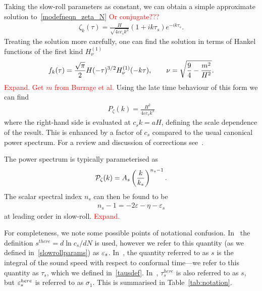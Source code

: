     Taking the slow-roll parameters as constant, we can obtain a simple approximate solution
    to~\eqref{modefneqn_zeta_N}
    \textcolor{red}{Or conjugate???}
    \begin{align}\label{uk_solution}
        \zeta_k(\tau) = \frac{H}{\sqrt{4\varepsilon c_s k^3}}\left(1+ik\tau_s\right)e^{-i k\tau_s}.
    \end{align}
    Treating the solution more carefully, one can find
    the solution in terms of Hankel functions of the first kind $H_{\nu}^{(1)}$
    \begin{align}
        f_k(\tau) = \frac{\sqrt{\pi}}{2}H(-\tau)^{3/2}H^{(1)}_{\nu}(-k\tau),\qquad
        \nu = \sqrt{\frac{9}{4} - \frac{m^2}{H^2}}.
    \end{align}
    \textcolor{red}{Expand. Get $m$ from Burrage et al.}
    Using the late time behaviour of this form we can find
    \begin{align}
        P_\zeta(k) = \frac{H^2}{4\varepsilon c_s k^3}
    \end{align}
    where the right-hand side is evaluated at $c_sk=aH$,
    defining the scale dependence of the result.
    This is enhanced by a factor of $c_s$ compared to the
    usual canonical power spectrum.
    For a review and discussion of corrections see~\cite{px_burrage}.


The power spectrum is typically parameterised as
\begin{align}
    \mathcal{P}_{\mathcal{\zeta}}(k) = A_s \left(\frac{k}{k_*}\right)^{n_s-1}.
\end{align}
The scalar spectral index $n_s$ can then be found to be
\begin{align}
n_s-1 = -2\varepsilon-\eta-\varepsilon_s
\end{align}
at leading order in slow-roll.
    \textcolor{red}{Expand.}


    For completeness, we note some possible points of notational confusion.
    In~\cite{px_burrage} the definition $s^{there}=d\ln c_s/dN$ is used, however we refer to this
    quantity (as we defined in~\eqref{slowrollparams}) as $\varepsilon_{s}$.
    In~\cite{Hu_2011}, the quantity referred to as $s$ is the integral of the sound speed
    with respect to conformal time---we refer to this quantity as $\tau_s$,
    which we defined in~\eqref{tausdef}.
    In~\cite{warp_features_dbi}, $\tau_s^{here}$ is also referred to as $s$,
    but $\varepsilon_{s}^{here}$ is referred to as $\sigma_1$.
    This is summarised in Table~\ref{tab:notation}.


